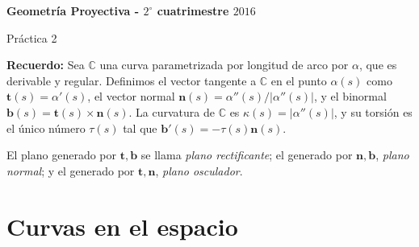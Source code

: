 \documentclass[11pt]{article}
\newcommand{\C}{\mathbb{C}}
\renewcommand\tt{\mathbf{t}}
\newcommand\nn{\mathbf{n}}
\newcommand\bb{\mathbf{b}}                      %
\newcommand\kk{\kappa}
\begin{document}
	
	\pagestyle{empty}
	\pagestyle{fancy}
	\fancyfoot[CO]{\slshape \thepage}
	\renewcommand{\headrulewidth}{0pt}
	
	
	
	\centerline{\bf Geometr\'ia Proyectiva - $2^{\circ}$ cuatrimestre $2016$}
	\centerline{\sc Pr\'actica 2}
	
	\bigskip
	
\textbf{Recuerdo:}
Sea $\C$ una curva parametrizada por longitud de arco por $\alpha$, que es derivable y
regular. Definimos el vector tangente a $\C$ en el punto
$\alpha(s)$ como $\tt(s) = \alpha'(s)$, el
vector normal $\nn(s) = \alpha''(s)/|\alpha''(s)|$, y el binormal $\bb(s) = \tt(s) \times
\nn(s)$. La curvatura de $\C$ es $\kk(s) = |\alpha''(s)|$, y su torsi\'on es el \'unico n\'umero
$\tau(s)$ tal que $\bb'(s) = -\tau(s)\nn(s)$.

El plano generado por $\tt,\bb$ se llama \emph{plano rectificante}; el generado por
$\nn, \bb$, \emph{plano normal}; y el generado por $\tt,\nn$, \emph{plano osculador}.

\section{Curvas en el espacio}
\end{document}
